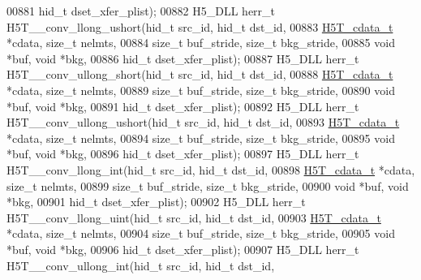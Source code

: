 \begin{DoxyCode}
00881                                     hid\_t dset\_xfer\_plist);
00882 H5\_DLL herr\_t H5T\_\_conv\_llong\_ushort(hid\_t src\_id, hid\_t dst\_id,
00883                      \hyperlink{struct_h5_t__cdata__t}{H5T\_cdata\_t} *cdata, \textcolor{keywordtype}{size\_t} nelmts,
00884                      \textcolor{keywordtype}{size\_t} buf\_stride, \textcolor{keywordtype}{size\_t} bkg\_stride,
00885                                      \textcolor{keywordtype}{void} *buf, \textcolor{keywordtype}{void} *bkg,
00886                                      hid\_t dset\_xfer\_plist);
00887 H5\_DLL herr\_t H5T\_\_conv\_ullong\_short(hid\_t src\_id, hid\_t dst\_id,
00888                      \hyperlink{struct_h5_t__cdata__t}{H5T\_cdata\_t} *cdata, \textcolor{keywordtype}{size\_t} nelmts,
00889                      \textcolor{keywordtype}{size\_t} buf\_stride, \textcolor{keywordtype}{size\_t} bkg\_stride,
00890                                      \textcolor{keywordtype}{void} *buf, \textcolor{keywordtype}{void} *bkg,
00891                                      hid\_t dset\_xfer\_plist);
00892 H5\_DLL herr\_t H5T\_\_conv\_ullong\_ushort(hid\_t src\_id, hid\_t dst\_id,
00893                       \hyperlink{struct_h5_t__cdata__t}{H5T\_cdata\_t} *cdata, \textcolor{keywordtype}{size\_t} nelmts,
00894                       \textcolor{keywordtype}{size\_t} buf\_stride, \textcolor{keywordtype}{size\_t} bkg\_stride,
00895                                       \textcolor{keywordtype}{void} *buf, \textcolor{keywordtype}{void} *bkg,
00896                                       hid\_t dset\_xfer\_plist);
00897 H5\_DLL herr\_t H5T\_\_conv\_llong\_int(hid\_t src\_id, hid\_t dst\_id,
00898                   \hyperlink{struct_h5_t__cdata__t}{H5T\_cdata\_t} *cdata, \textcolor{keywordtype}{size\_t} nelmts,
00899                   \textcolor{keywordtype}{size\_t} buf\_stride, \textcolor{keywordtype}{size\_t} bkg\_stride,
00900                                   \textcolor{keywordtype}{void} *buf, \textcolor{keywordtype}{void} *bkg,
00901                                   hid\_t dset\_xfer\_plist);
00902 H5\_DLL herr\_t H5T\_\_conv\_llong\_uint(hid\_t src\_id, hid\_t dst\_id,
00903                    \hyperlink{struct_h5_t__cdata__t}{H5T\_cdata\_t} *cdata, \textcolor{keywordtype}{size\_t} nelmts,
00904                    \textcolor{keywordtype}{size\_t} buf\_stride, \textcolor{keywordtype}{size\_t} bkg\_stride,
00905                                    \textcolor{keywordtype}{void} *buf, \textcolor{keywordtype}{void} *bkg,
00906                                    hid\_t dset\_xfer\_plist);
00907 H5\_DLL herr\_t H5T\_\_conv\_ullong\_int(hid\_t src\_id, hid\_t dst\_id,

\end{DoxyCode}
